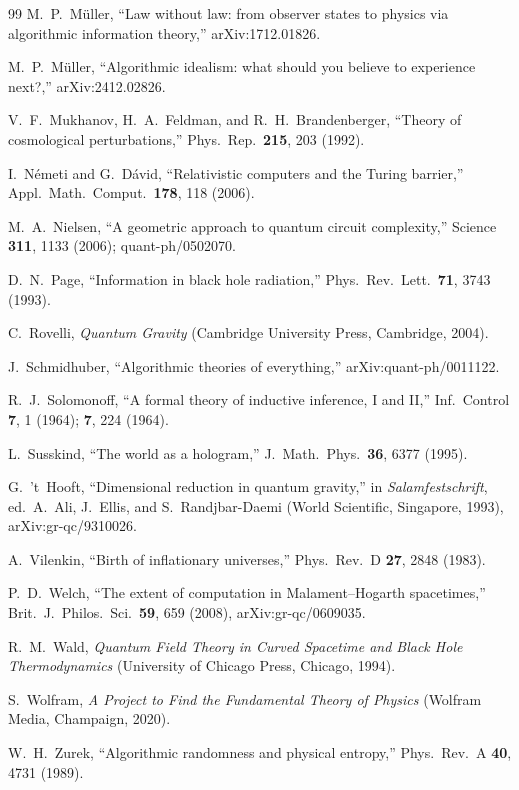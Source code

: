 \documentclass[11pt,a4paper]{article}
\theoremstyle{plain}
\theoremstyle{definition}
\theoremstyle{remark}
\begin{document}
\begin{thebibliography}{99}
M.~P.~M\"uller,
``Law without law: from observer states to physics via algorithmic information theory,''
arXiv:1712.01826.

M.~P.~M\"uller,
``Algorithmic idealism: what should you believe to experience next?,''
arXiv:2412.02826.

V.~F.~Mukhanov, H.~A.~Feldman, and R.~H.~Brandenberger,
``Theory of cosmological perturbations,''
Phys.\ Rep.\ \textbf{215}, 203 (1992).

I.~N\'emeti and G.~D\'avid,
``Relativistic computers and the Turing barrier,''
Appl.\ Math.\ Comput.\ \textbf{178}, 118 (2006).

M.~A.~Nielsen,
``A geometric approach to quantum circuit complexity,''
Science \textbf{311}, 1133 (2006); quant-ph/0502070.

D.~N.~Page,
``Information in black hole radiation,''
Phys.\ Rev.\ Lett.\ \textbf{71}, 3743 (1993).

C.~Rovelli,
\textit{Quantum Gravity}
(Cambridge University Press, Cambridge, 2004).

J.~Schmidhuber,
``Algorithmic theories of everything,''
arXiv:quant-ph/0011122.

R.~J.~Solomonoff,
``A formal theory of inductive inference, I and II,''
Inf.\ Control \textbf{7}, 1 (1964); \textbf{7}, 224 (1964).

L.~Susskind,
``The world as a hologram,''
J.\ Math.\ Phys.\ \textbf{36}, 6377 (1995).

G.~'t~Hooft,
``Dimensional reduction in quantum gravity,''
in \textit{Salamfestschrift},
ed.\ A.~Ali, J.~Ellis, and S.~Randjbar-Daemi
(World Scientific, Singapore, 1993),
arXiv:gr-qc/9310026.

A.~Vilenkin,
``Birth of inflationary universes,''
Phys.\ Rev.\ D \textbf{27}, 2848 (1983).

P.~D.~Welch,
``The extent of computation in Malament--Hogarth spacetimes,''
Brit.\ J.\ Philos.\ Sci.\ \textbf{59}, 659 (2008),
arXiv:gr-qc/0609035.

R.~M.~Wald,
\textit{Quantum Field Theory in Curved Spacetime and Black Hole Thermodynamics}
(University of Chicago Press, Chicago, 1994).

S.~Wolfram,
\textit{A Project to Find the Fundamental Theory of Physics}
(Wolfram Media, Champaign, 2020).

W.~H.~Zurek,
``Algorithmic randomness and physical entropy,''
Phys.\ Rev.\ A \textbf{40}, 4731 (1989).

\end{thebibliography}
\end{document}
